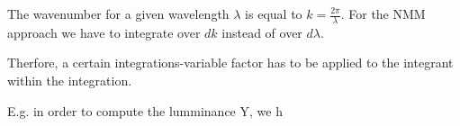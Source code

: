 The wavenumber for a given wavelength $\lambda$ is equal to $k = \frac{2 \pi}{\lambda}$. For the NMM approach we have to integrate over $dk$ instead of over $d\lambda$. 





Therfore, a certain integrations-variable factor has to be applied to the integrant within the integration. 



E.g. in order to compute the lumminance Y, we h 
